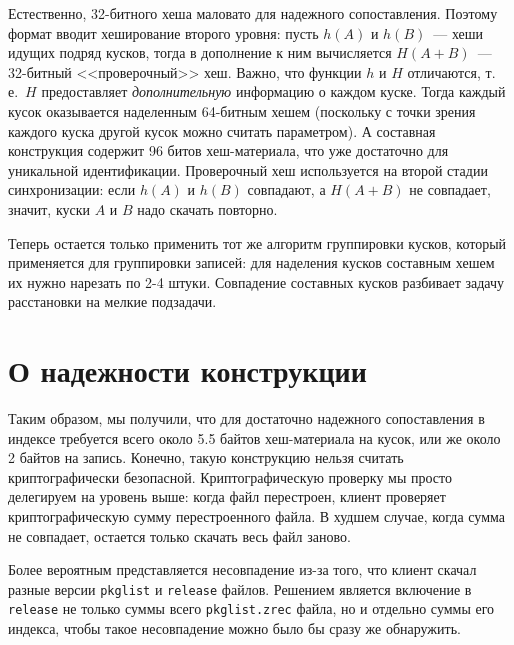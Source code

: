 \documentclass[russian,a4paper,12pt]{article}
\begin{document}
Естественно, 32-битного хеша маловато для надежного сопоставления.  Поэтому формат вводит хеширование второго уровня:
пусть $h(A)$ и $h(B)$~--- хеши идущих подряд кусков, тогда в дополнение к ним вычисляется $H(A+B)$~--- 32-битный <<проверочный>>
хеш.  Важно, что функции $h$ и $H$ отличаются, т.\,е.~$H$ предоставляет \textit{дополнительную} информацию о каждом куске.
Тогда каждый кусок оказывается наделенным 64-битным хешем (поскольку с точки зрения каждого куска другой кусок можно считать
параметром).  А составная конструкция содержит 96 битов хеш-материала, что уже достаточно для уникальной идентификации.
Проверочный хеш используется на второй стадии синхронизации: если $h(A)$ и $h(B)$ совпадают, а $H(A+B)$ не совпадает, значит,
куски $A$ и $B$ надо скачать повторно.

Теперь остается только применить тот же алгоритм группировки кусков, который применяется для группировки записей:
для наделения кусков составным хешем их нужно нарезать по 2-4 штуки.  Совпадение составных кусков разбивает задачу
расстановки на мелкие подзадачи.

\section{О надежности конструкции}
Таким образом, мы получили, что для достаточно надежного сопоставления в индексе требуется всего около 5.5 байтов
хеш-материала на кусок, или же около 2 байтов на запись.  Конечно, такую конструкцию нельзя считать криптографически безопасной.
Криптографическую проверку мы просто делегируем на уровень выше: когда файл перестроен, клиент проверяет
криптографическую сумму перестроенного файла.  В худшем случае, когда сумма не совпадает, остается только
скачать весь файл заново.

Более вероятным представляется несовпадение из-за того, что клиент скачал разные версии \verb|pkglist|
и \verb|release| файлов.  Решением является включение в \verb|release| не только суммы всего \verb|pkglist.zrec|
файла, но и отдельно суммы его индекса, чтобы такое несовпадение можно было бы сразу же обнаружить.
\end{document}
